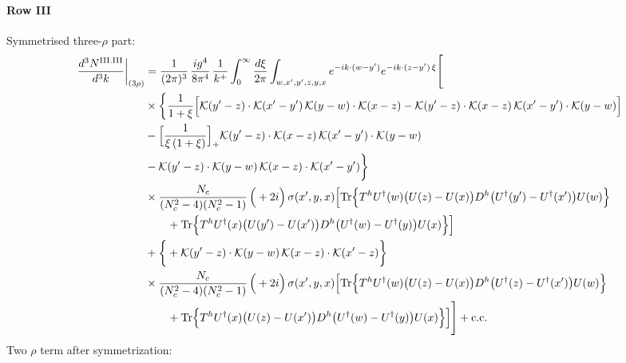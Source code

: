 \documentclass[9pt]{article}
\numberwithin{equation}{section}
\begin{document}
\paragraph*{Row III}
Symmetrised three-$\rho$ part:
\begin{align}
\frac{d^{3}N^{\rm III.III}}{d^{3}k}\bigg|_{(3\rho)}&=\frac{1}{(2\pi)^{3}}\,\frac{ig^{4}}{8\pi^{4}}\,\frac{1}{k^{+}}\int_{0}^{\infty}\frac{d\xi}{2\pi}\int_{w,x',y',z,y,x}e^{-ik\cdot(w-y')}e^{-ik\cdot(z-y')\,\xi}\Bigg[\notag\\
&\times\bigg\{\frac{1}{1+\xi}\Big[\mathcal{K}(y'-z)\cdot\mathcal{K}(x'-y')\,\mathcal{K}(y-w)\cdot\mathcal{K}(x-z)-\mathcal{K}(y'-z)\cdot\mathcal{K}(x-z)\,\mathcal{K}(x'-y')\cdot\mathcal{K}(y-w)\Big]\notag\\
&-\Big[\frac{1}{\xi\,(1+\xi)}\Big]_{+}\mathcal{K}(y'-z)\cdot\mathcal{K}(x-z)\,\mathcal{K}(x'-y')\cdot\mathcal{K}(y-w)\notag\\
&-\mathcal{K}(y'-z)\cdot\mathcal{K}(y-w)\,\mathcal{K}(x-z)\cdot\mathcal{K}(x'-y')\bigg\}\notag\\
&\times \frac{N_{c}}{(N_{c}^{2}-4)(N_{c}^{2}-1)}\,\Big(+2i\Big)\,\sigma(x',y,x)\Big[{\rm Tr}\Big\{T^{h}U^{\dagger}(w)\big(U(z)-U(x)\big)D^{h}\big(U^{\dagger}(y')-U^{\dagger}(x')\big)U(w)\Big\}\notag\\&\qquad+{\rm Tr}\Big\{T^{h}U^{\dagger}(x)\big(U(y')-U(x')\big)D^{h}\big(U^{\dagger}(w)-U^{\dagger}(y)\big)U(x)\Big\}\Big]\notag\\
&+\bigg\{+\mathcal{K}(y'-z)\cdot\mathcal{K}(y-w)\,\mathcal{K}(x-z)\cdot\mathcal{K}(x'-z)\bigg\}\notag\\
&\times \frac{N_{c}}{(N_{c}^{2}-4)(N_{c}^{2}-1)}\,\Big(+2i\Big)\,\sigma(x',y,x)\Big[{\rm Tr}\Big\{T^{h}U^{\dagger}(w)\big(U(z)-U(x)\big)D^{h}\big(U^{\dagger}(z)-U^{\dagger}(x')\big)U(w)\Big\}\notag\\&\qquad+{\rm Tr}\Big\{T^{h}U^{\dagger}(x)\big(U(z)-U(x')\big)D^{h}\big(U^{\dagger}(w)-U^{\dagger}(y)\big)U(x)\Big\}\Big]\Bigg]+{\rm c.c.}\label{eq:S-III.III-3}
\end{align}
Two $\rho$ term after symmetrization:
\end{document}
